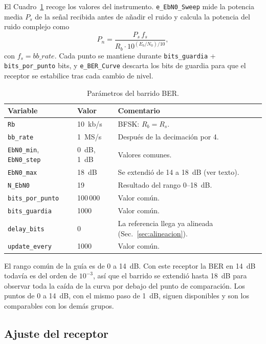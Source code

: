 \documentclass[conference]{IEEEtran}
\begin{document}
El Cuadro~\ref{tab:barrido} recoge los valores del instrumento. \texttt{e\_EbN0\_Sweep} mide la potencia media $P_s$ de la señal recibida antes de añadir el ruido y calcula la potencia del ruido complejo como
\begin{equation}
P_n = \frac{P_s \, f_s}{R_b \cdot 10^{(E_b/N_0)/10}},
\label{eq:pn}
\end{equation}
con $f_s = bb\_rate$. Cada punto se mantiene durante \texttt{bits\_guardia} + \texttt{bits\_por\_punto} bits, y \texttt{e\_BER\_Curve} descarta los bits de guardia para que el receptor se estabilice tras cada cambio de nivel.

\begin{table}[!t]
\centering
\caption{Parámetros del barrido BER.}
\label{tab:barrido}
\begin{tabular}{>{\raggedright}p{2.3cm}>{\raggedright}p{1.4cm}p{3.9cm}}
\toprule
Variable & Valor & Comentario \\
\midrule
\texttt{Rb} & 10~kb/s & BFSK: $R_b = R_s$. \\
\texttt{bb\_rate} & 1~MS/s & Después de la decimación por 4. \\
\texttt{EbN0\_min}, \texttt{EbN0\_step} & 0~dB, 1~dB & Valores comunes. \\
\texttt{EbN0\_max} & 18~dB & Se extendió de 14 a 18~dB (ver texto). \\
\texttt{N\_EbN0} & 19 & Resultado del rango 0--18~dB. \\
\texttt{bits\_por\_punto} & 100\,000 & Valor común. \\
\texttt{bits\_guardia} & 1000 & Valor común. \\
\texttt{delay\_bits} & 0 & La referencia llega ya alineada (Sec.~\ref{sec:alineacion}). \\
\texttt{update\_every} & 1000 & Valor común. \\
\bottomrule
\end{tabular}
\end{table}

El rango común de la guía es de 0 a 14~dB. Con este receptor la BER en 14~dB todavía es del orden de $10^{-3}$, así que el barrido se extendió hasta 18~dB para observar toda la caída de la curva por debajo del punto de comparación. Los puntos de 0 a 14~dB, con el mismo paso de 1~dB, siguen disponibles y son los comparables con los demás grupos.

\subsection{Ajuste del receptor}
\end{document}
